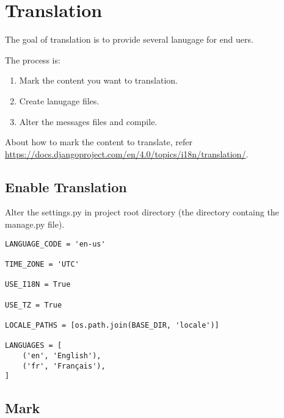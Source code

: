 
\chapter{Translation}
The goal of translation is to provide several lanugage for end uers.

The process is:
\begin{enumerate}
\item Mark the content you want to translation.
\item Create lanugage files.
\item Alter the messages files and compile.
\end{enumerate}

About how to mark the content to translate, refer \url{https://docs.djangoproject.com/en/4.0/topics/i18n/translation/}.

\section{Enable  Translation}

Alter the settings.py in project root directory (the directory containg the manage.py file).

\begin{lstlisting}
LANGUAGE_CODE = 'en-us'

TIME_ZONE = 'UTC'

USE_I18N = True

USE_TZ = True

LOCALE_PATHS = [os.path.join(BASE_DIR, 'locale')]

LANGUAGES = [
    ('en', 'English'),
    ('fr', 'Français'),
]
\end{lstlisting}

\section{Mark}

